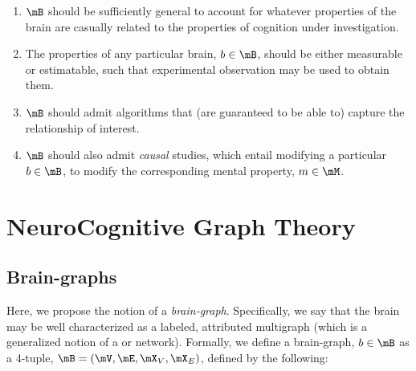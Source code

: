 \begin{enumerate}
	\item $\mB$ %
	should be sufficiently general to account for whatever properties of the brain are casually related to the properties of cognition under investigation.
	\item The properties of any particular brain, $b\in \mB$, should be either measurable or estimatable, such that experimental observation may be used to obtain them.
	\item $\mB$ should admit algorithms that (are guaranteed to be able to) capture the relationship of interest.
	\item $\mB$ should also admit \emph{causal} studies, which entail modifying a particular $b \in \mB$, to modify the corresponding mental property, $m \in \mM$.
\end{enumerate}

\section{NeuroCognitive Graph Theory}

\subsection{Brain-graphs}

Here, we propose the notion of a \emph{brain-graph}.  Specifically, we say that the brain may be well characterized as a labeled, attributed multigraph (which is a generalized notion of a or network).  Formally, we define a brain-graph, $b\in \mB$ as a 4-tuple, $\mB=(\mV,\mE,\mX_V, \mX_E)$, defined by the following:

